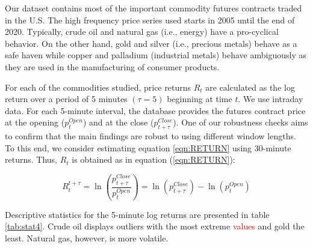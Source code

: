 \documentclass[12pt]{article}
\begin{document}
Our dataset contains most of the important commodity futures contracts traded in the U.S. The high frequency price series used starts in 2005 until the end of 2020.
Typically, crude oil and natural gas (i.e., energy) have a pro-cyclical behavior. On the other hand, gold and silver (i.e., precious metals) behave as a safe haven while copper and palladium (industrial metals) behave ambiguously as they are used in the manufacturing of consumer products.


For each of the commodities studied, price returns $R_t$ are calculated as the log return over a period of 5 minutes $(\tau=5)$ beginning at time $t$. We use intraday data. For each 5-minute interval, the database provides the futures contract price at the opening ($p_{t}^{Open}$)  and at the close ($p_{t+\tau}^{Close}$). One of our robustness checks aims to confirm that the main findings are robust to using different window lengths. To this end, we consider estimating equation \ref{eqn:RETURN}  using 30-minute returns.  Thus, $R_t$ is obtained  as in equation (\ref{eqn:RETURN}):

\begin{equation}\label{eqn:RETURN}
R_t^{t+\tau}=\ln \left( \frac{p_{t+\tau}^{Close}}{p_{t}^{Open}} \right)=\ln (p_{t+\tau}^{Close})-\ln(p_{t}^{Open})
\end{equation}

Descriptive statistics for the 5-minute log returns are presented in table \ref{tab:stat4}. Crude oil displays  outliers with the most extreme \textcolor{red}{values} and gold the least. Natural gas, however, is more volatile. %

\end{document}
